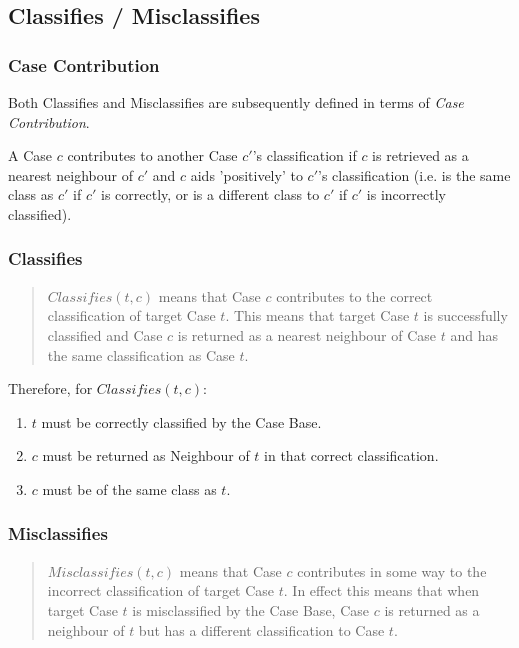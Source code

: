 \documentclass[a4paper,11pt]{report}
\begin{document}
\subsection{Classifies / Misclassifies}
\subsubsection{Case Contribution\label{sec:contributes}}
Both Classifies and Misclassifies are subsequently defined in terms of \emph{Case Contribution}.

A Case $c$ contributes to another Case $c'$'s classification if $c$ is retrieved as a nearest neighbour of $c'$ and $c$ aids 'positively' to $c'$'s classification (i.e. is the same class as $c'$ if $c'$ is correctly, or is a different class to  $c'$ if  $c'$ is incorrectly classified).
\subsubsection{Classifies}
\begin{quote}
$ Classifies(t, c) $ means that Case $c$ contributes to the correct classification of target Case $t$. This means that target Case $t$ is successfully classified and Case $c$ is returned as a nearest neighbour of Case $t$ and has the same classification as Case $t$.\cite{Delany2009}
\end{quote}

Therefore, for $ Classifies(t, c) $:
\begin{enumerate}
	\item $t$ must be correctly classified by the Case Base.
	\item $c$ must be returned as Neighbour of $t$ in that correct classification.
	\item $c$ must be of the same class as $t$.
\end{enumerate}

\subsubsection{Misclassifies}

\begin{quote}
$ Misclassifies(t, c ) $ means that Case $c$ contributes in some way to the incorrect classification of target Case $t$. In effect this means that when target Case $t$ is misclassified by the Case Base, Case $c$ is returned as a neighbour of $t$ but has a different classification to Case $t$.\cite{Delany2009}
\end{quote}
\end{document}
